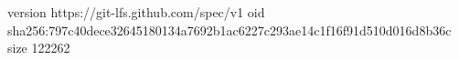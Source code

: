 version https://git-lfs.github.com/spec/v1
oid sha256:797c40dece32645180134a7692b1ac6227c293ae14c1f16f91d510d016d8b36c
size 122262
